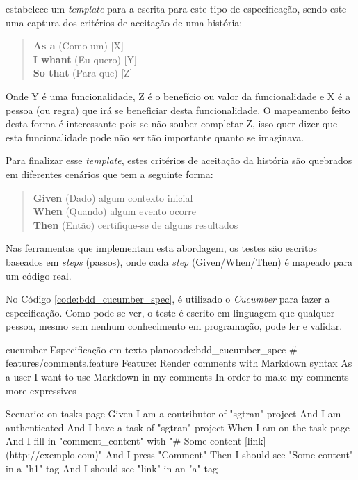  estabelece um \textit{template} para a escrita para este tipo de especificação, sendo este uma captura dos critérios de aceitação de uma história:

\begin{quote}
\textbf{As a} (Como um) [X]\\
\textbf{I whant} (Eu quero) [Y]\\
\textbf{So that} (Para que) [Z]
\end{quote}

Onde Y é uma funcionalidade, Z é o benefício ou valor da funcionalidade e X é a pessoa (ou regra) que irá se beneficiar desta funcionalidade. O mapeamento feito desta forma é interessante pois se não souber completar Z, isso quer dizer que esta funcionalidade pode não ser tão importante quanto se imaginava.

Para finalizar esse \textit{template}, estes critérios de aceitação da história são quebrados em diferentes cenários que tem a seguinte forma:

\begin{quote}
\textbf{Given} (Dado) algum contexto inicial\\
\textbf{When} (Quando) algum evento ocorre\\
\textbf{Then} (Então) certifique-se de alguns resultados
\end{quote}

Nas ferramentas que implementam esta abordagem, os testes são escritos baseados em \textit{steps} (passos), onde cada \textit{step} (Given/When/Then) é mapeado para um código real.

No Código \ref{code:bdd_cucumber_spec}, é utilizado o \textit{Cucumber} para fazer a especificação. Como pode-se ver, o teste é escrito em linguagem que qualquer pessoa, mesmo sem nenhum conhecimento em programação, pode ler e validar.

\begin{mycode}{cucumber}%
{Especificação em texto plano}{code:bdd_cucumber_spec}
# features/comments.feature
Feature: Render comments with Markdown syntax
  As a user
  I want to use Markdown in my comments
  In order to make my comments more expressives

  Scenario: on tasks page
    Given I am a contributor of "sgtran" project
    And I am authenticated
    And I have a task of "sgtran" project
    When I am on the task page
    And I fill in "comment_content" with "# Some content [link](http://exemplo.com)"
    And I press "Comment"
    Then I should see "Some content" in a "h1" tag
    And I should see "link" in an "a" tag
\end{mycode}

